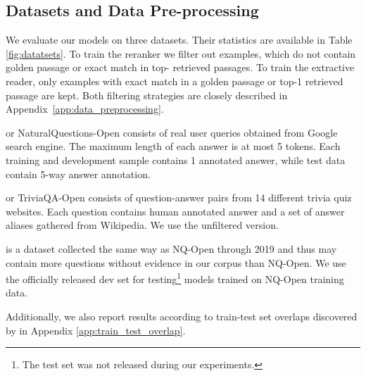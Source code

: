\documentclass[11pt]{article}
\begin{document}
\subsection{Datasets and Data Pre-processing}

We evaluate our models on three datasets. Their statistics are available in Table \ref{fig:datatsets}. To train the reranker we filter out examples, which do not contain golden passage or exact match in top- retrieved passages. 
To train the extractive reader, only examples with exact match in a golden passage or top-1 retrieved passage are kept. Both filtering strategies are closely described in Appendix~\ref{app:data_preprocessing}.


\begin{description}[style=unboxed,leftmargin=0em,listparindent=\parindent]
\setlength\parskip{0em}
\item[NQ-Open] \cite{kwiatkowski2019natural, lee-etal-2019-latent} or NaturalQuestions-Open consists of real user queries obtained from Google search engine. The maximum length of each answer is at most 5 tokens. Each training and development sample contains 1 annotated answer, while test data contain 5-way answer annotation.

\item[TQ-Open] \cite{joshi-etal-2017-triviaqa} or TriviaQA-Open consists of question-answer pairs from 14 different trivia quiz websites. Each question contains human annotated answer and a set of answer aliases gathered from Wikipedia. We use the unfiltered version.

\item[EfficientQA] \cite{min2021neurips} is a dataset collected the same way as NQ-Open through 2019 and thus may contain more questions without evidence in our corpus than NQ-Open. We use the officially released dev set for testing\footnote{The test set was not released during our experiments.} models trained on NQ-Open training data.
\end{description}
Additionally, we also report results according to train-test set overlaps discovered by \citet{lewis-etal-2021-question} in Appendix \ref{app:train_test_overlap}.
\end{document}
